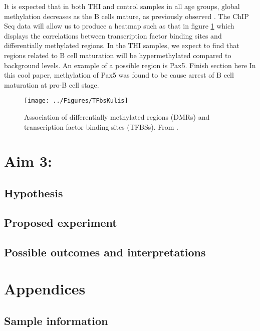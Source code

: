 \documentclass[12pt]{article}
\begin{document}
			It is expected that in both THI and control samples in all age groups, global methylation decreases as the B cells mature, as previously observed \citep{Kulis15,Lai13,Kulis12,Shaknovich11}. 
			The ChIP Seq data will allow us to produce a heatmap such as that in figure \ref{fig:TFBSheatmap} which displays the correlations between transcription factor binding sites and differentially methylated regions. 
			In the THI samples, we expect to find that regions related to B cell maturation will be hypermethylated compared to background levels. 
			An example of a possible region is Pax5. {\Huge Finish section here}
			In this cool paper, methylation of Pax5 was found to be cause arrest of B cell maturation at pro-B cell stage. 
			
			
			
			\begin{figure}[tb]
				\centering
				\texttt{[image: ../Figures/TFbsKulis]}
				\caption{Association of differentially methylated regions (DMRs) and transcription factor binding sites (TFBSs). From \citet{Kulis15}.}
				\label{fig:TFBSheatmap}
			\end{figure}
		
	\section{Aim 3:}
	
		\subsection{Hypothesis}
		
		\subsection{Proposed experiment}
		
		\subsection{Possible outcomes and interpretations}				
	

\appendix
	\section{Appendices}
		
		\subsection{Sample information}
\end{document}
